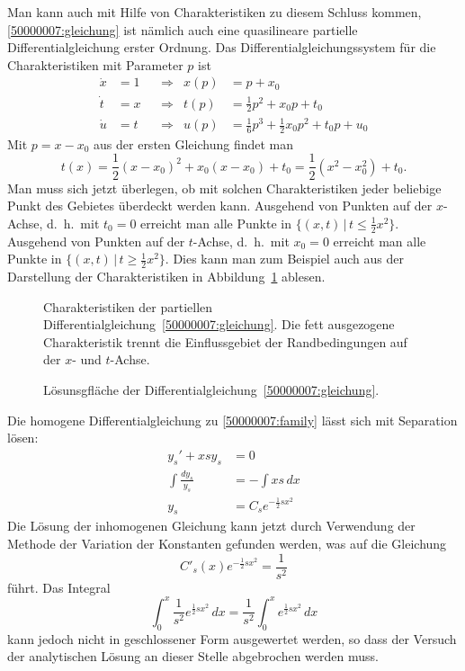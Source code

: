 \begin{loesung}
\begin{teilaufgaben}
Man kann auch mit Hilfe von Charakteristiken zu diesem Schluss kommen, 
\eqref{50000007:gleichung} ist nämlich auch eine quasilineare partielle
Differentialgleichung erster Ordnung.
Das Differentialgleichungssystem für die Charakteristiken mit Parameter $p$
ist
\begin{align*}
\dot x&=1&&\Rightarrow&x(p)&=p+x_0\\
\dot t&=x&&\Rightarrow&t(p)&=\frac12p^2+x_0p+t_0\\
\dot u&=t&&\Rightarrow&u(p)&=\frac16p^3+\frac12x_0p^2+t_0p+u_0
\end{align*}
Mit $p=x-x_0$ aus der ersten Gleichung findet man
\[
t(x)=\frac12(x-x_0)^2+x_0(x-x_0)+t_0=\frac12(x^2-x_0^2)+t_0.
\]
Man muss sich jetzt überlegen, ob mit solchen Charakteristiken
jeder beliebige Punkt des Gebietes überdeckt werden kann.
Ausgehend von Punkten auf der $x$-Achse, d.~h.~mit $t_0=0$
erreicht man alle Punkte in $\{(x,t)\,|\, t\le \frac12x^2\}$.
Ausgehend von Punkten auf der $t$-Achse, d.~h.~mit $x_0=0$
erreicht man alle Punkte in $\{(x,t)\,|\, t\ge \frac12x^2\}$.
Dies kann man zum Beispiel auch aus der Darstellung
der Charakteristiken in Abbildung~\ref{50000007:bild}
ablesen.
\begin{figure}
\begin{center}
\end{center}
\caption{Charakteristiken der partiellen
Differentialgleichung~\eqref{50000007:gleichung}.
Die fett ausgezogene Charakteristik trennt die Einflussgebiet der
Randbedingungen auf der $x$- und $t$-Achse.
\label{50000007:bild}}
\end{figure}
\begin{figure}
\centering
{}
\caption{Lösunsgfläche der Differentialgleichung~\eqref{50000007:gleichung}.
\label{50000007:loesungsflaeche}}
\end{figure}
\item
Die homogene Differentialgleichung zu \eqref{50000007:family} lässt sich
mit Separation lösen:
\begin{align*}
y_s'  + xsy_s&=0
\\
\int\frac{dy_s}{y_s}&=-\int xs\,dx
\\
y_s&=C_se^{-\frac12sx^2}
\end{align*}
Die Lösung der inhomogenen Gleichung kann jetzt durch Verwendung der
Methode der Variation der Konstanten gefunden werden, was auf die
Gleichung 
\[
C'_s(x)e^{-\frac12sx^2}=\frac1{s^2}
\]
führt.
Das Integral 
\[
\int_0^x\frac1{s^2}e^{\frac12sx^2}\,dx
=\frac1{s^2}
\int_0^xe^{\frac12sx^2}\,dx
\]
kann jedoch nicht in geschlossener Form ausgewertet werden, so dass der
Versuch der analytischen Lösung an dieser Stelle abgebrochen werden muss.
\qedhere
\end{teilaufgaben}
\end{loesung}

